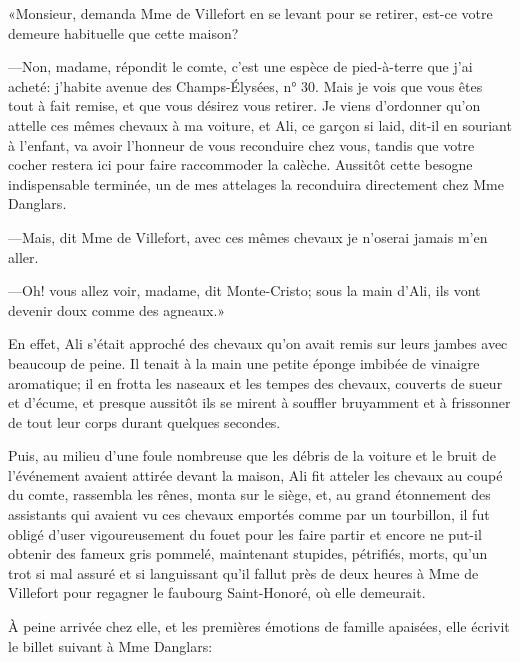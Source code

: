 «Monsieur, demanda Mme de Villefort en se levant pour se retirer, est-ce votre demeure habituelle que cette maison? 

—Non, madame, répondit le comte, c'est une espèce de pied-à-terre que j'ai acheté: j'habite avenue des Champs-Élysées, n° 30. Mais je vois que vous êtes tout à fait remise, et que vous désirez vous retirer. Je viens d'ordonner qu'on attelle ces mêmes chevaux à ma voiture, et Ali, ce garçon si laid, dit-il en souriant à l'enfant, va avoir l'honneur de vous reconduire chez vous, tandis que votre cocher restera ici pour faire raccommoder la calèche. Aussitôt cette besogne indispensable terminée, un de mes attelages la reconduira directement chez Mme Danglars. 

—Mais, dit Mme de Villefort, avec ces mêmes chevaux je n'oserai jamais m'en aller.  

—Oh! vous allez voir, madame, dit Monte-Cristo; sous la main d'Ali, ils vont devenir doux comme des agneaux.» 

En effet, Ali s'était approché des chevaux qu'on avait remis sur leurs jambes avec beaucoup de peine. Il tenait à la main une petite éponge imbibée de vinaigre aromatique; il en frotta les naseaux et les tempes des chevaux, couverts de sueur et d'écume, et presque aussitôt ils se mirent à souffler bruyamment et à frissonner de tout leur corps durant quelques secondes. 

Puis, au milieu d'une foule nombreuse que les débris de la voiture et le bruit de l'événement avaient attirée devant la maison, Ali fit atteler les chevaux au coupé du comte, rassembla les rênes, monta sur le siège, et, au grand étonnement des assistants qui avaient vu ces chevaux emportés comme par un tourbillon, il fut obligé d'user vigoureusement du fouet pour les faire partir et encore ne put-il obtenir des fameux gris pommelé, maintenant stupides, pétrifiés, morts, qu'un trot si mal assuré et si languissant qu'il fallut près de deux heures à Mme de Villefort pour regagner le faubourg Saint-Honoré, où elle demeurait. 

À peine arrivée chez elle, et les premières émotions de famille apaisées, elle écrivit le billet suivant à Mme Danglars: 

